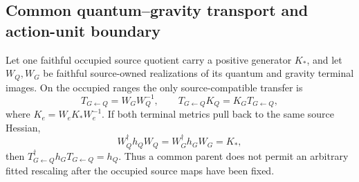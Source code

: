 \documentclass[11pt]{article}
\begin{document}
\subsection{Common quantum--gravity transport and action-unit boundary}

Let one faithful occupied source quotient carry a positive generator $K_*$,
and let $W_Q,W_G$ be faithful source-owned realizations of its quantum and
gravity terminal images.  On the occupied ranges the only source-compatible
transfer is
\begin{equation}
 T_{G\leftarrow Q}=W_GW_Q^{-1},\qquad
 T_{G\leftarrow Q}K_Q=K_GT_{G\leftarrow Q},
 \label{eq:paperi-qg-natural-transport}
\end{equation}
where $K_e=W_eK_*W_e^{-1}$.  If both terminal metrics pull back to the same
source Hessian,
\[
 W_Q^\dagger h_QW_Q=W_G^\dagger h_GW_G=K_*,
\]
then $T_{G\leftarrow Q}^\dagger h_GT_{G\leftarrow Q}=h_Q$.  Thus a common
parent does not permit an arbitrary fitted rescaling after the occupied
source maps have been fixed.
\end{document}
